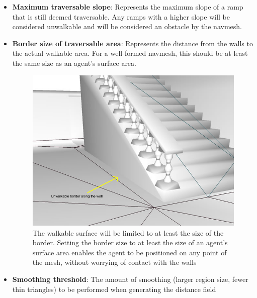 \begin{itemize}
  \item\textbf{Maximum traversable slope}: Represents the maximum slope of a ramp that is still deemed traversable. Any ramps with a higher slope will be considered unwalkable and will be considered an obstacle by the navmesh.
  
  \item\textbf{Border size of traversable area}: Represents the distance from the walls to the actual walkable area. For a well-formed navmesh, this should be at least the same size as an agent's surface area.
  
	\begin{figure}[H]
	\centering
	\includegraphics[width=1\textwidth]{../images/border_trav_size.png}
	\caption{The walkable surface will be limited to at least the size of the border. Setting the border size to at least the size of an agent's surface area enables the agent to be positioned on any point of the mesh, without worrying of contact with the walls}
\end{figure} 

  
  \item\textbf{Smoothing threshold}: The amount of smoothing (larger region size, fewer thin triangles) to be performed when generating the distance field
  
%



\end{itemize}
